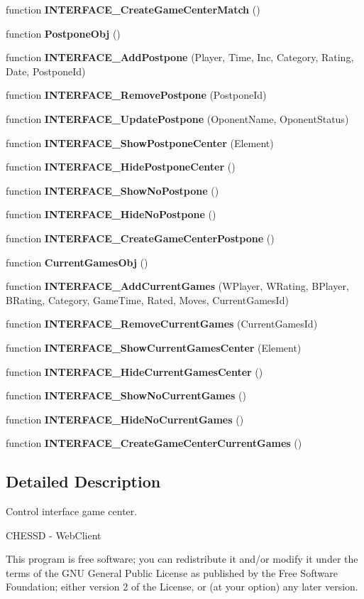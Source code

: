 \begin{CompactItemize}
\item 
function {\bf INTERFACE\_\-CreateGameCenterMatch} ()
\item 
function {\bf PostponeObj} ()
\item 
function {\bf INTERFACE\_\-AddPostpone} (Player, Time, Inc, Category, Rating, Date, PostponeId)
\item 
function {\bf INTERFACE\_\-RemovePostpone} (PostponeId)
\item 
function {\bf INTERFACE\_\-UpdatePostpone} (OponentName, OponentStatus)
\item 
function {\bf INTERFACE\_\-ShowPostponeCenter} (Element)
\item 
function {\bf INTERFACE\_\-HidePostponeCenter} ()
\item 
function {\bf INTERFACE\_\-ShowNoPostpone} ()
\item 
function {\bf INTERFACE\_\-HideNoPostpone} ()
\item 
function {\bf INTERFACE\_\-CreateGameCenterPostpone} ()
\item 
function {\bf CurrentGamesObj} ()
\item 
function {\bf INTERFACE\_\-AddCurrentGames} (WPlayer, WRating, BPlayer, BRating, Category, GameTime, Rated, Moves, CurrentGamesId)
\item 
function {\bf INTERFACE\_\-RemoveCurrentGames} (CurrentGamesId)
\item 
function {\bf INTERFACE\_\-ShowCurrentGamesCenter} (Element)
\item 
function {\bf INTERFACE\_\-HideCurrentGamesCenter} ()
\item 
function {\bf INTERFACE\_\-ShowNoCurrentGames} ()
\item 
function {\bf INTERFACE\_\-HideNoCurrentGames} ()
\item 
function {\bf INTERFACE\_\-CreateGameCenterCurrentGames} ()
\end{CompactItemize}


\subsection{Detailed Description}
Control interface game center. 

CHESSD - WebClient

This program is free software; you can redistribute it and/or modify it under the terms of the GNU General Public License as published by the Free Software Foundation; either version 2 of the License, or (at your option) any later version.

